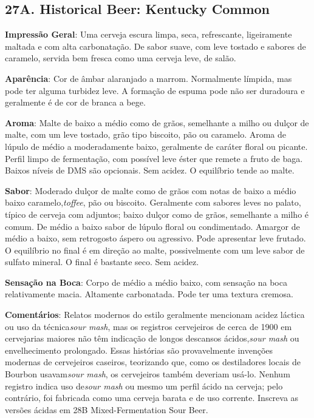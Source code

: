 \subsection*{27A. Historical Beer: Kentucky Common}

\textbf{Impressão Geral}: Uma cerveja escura limpa, seca, refrescante, ligeiramente maltada e com alta carbonatação. De sabor suave, com leve tostado e sabores de caramelo, servida bem fresca como uma cerveja leve, de salão.

\textbf{Aparência}: Cor de âmbar alaranjado a marrom. Normalmente límpida, mas pode ter alguma turbidez leve. A formação de espuma pode não ser duradoura e geralmente é de cor de branca a bege.

\textbf{Aroma}: Malte de baixo a médio como de grãos, semelhante a milho ou dulçor de malte, com um leve tostado, grão tipo biscoito, pão ou caramelo. Aroma de lúpulo de médio a moderadamente baixo, geralmente de caráter floral ou picante. Perfil limpo de fermentação, com possível leve éster que remete a fruto de baga. Baixos níveis de DMS são opcionais. Sem acidez. O equilíbrio tende ao malte.

\textbf{Sabor}: Moderado dulçor de malte como de grãos com notas de baixo a médio baixo caramelo,\textit{toffee}, pão ou biscoito. Geralmente com sabores leves no palato, típico de cerveja com adjuntos; baixo dulçor como de grãos, semelhante a milho é comum. De médio a baixo sabor de lúpulo floral ou condimentado. Amargor de médio a baixo, sem retrogosto áspero ou agressivo. Pode apresentar leve frutado. O equilíbrio no final é em direção ao malte, possivelmente com um leve sabor de sulfato mineral. O final é bastante seco. Sem acidez.

\textbf{Sensação na Boca}: Corpo de médio a médio baixo, com sensação na boca relativamente macia. Altamente carbonatada. Pode ter uma textura cremosa.

\textbf{Comentários}: Relatos modernos do estilo geralmente mencionam acidez láctica ou uso da técnica\textit{sour mash}, mas os registros cervejeiros de cerca de 1900 em cervejarias maiores não têm indicação de longos descansos ácidos,\textit{sour mash} ou envelhecimento prolongado. Essas histórias são provavelmente invenções modernas de cervejeiros caseiros, teorizando que, como os destiladores locais de Bourbon usavam\textit{sour mash}, os cervejeiros também deveriam usá-lo. Nenhum registro indica uso de\textit{sour mash} ou mesmo um perfil ácido na cerveja; pelo contrário, foi fabricada como uma cerveja barata e de uso corrente. Inscreva as versões ácidas em 28B Mixed-Fermentation Sour Beer.

